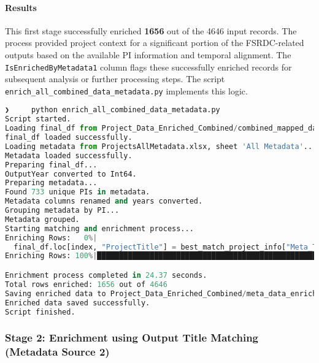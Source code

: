 \documentclass[12pt]{article}
\begin{document}
\paragraph{Results}\label{results-2}

This first stage successfully enriched \textbf{1656} out of the 4646
input records. The process provided project context for a significant
portion of the FSRDC-related outputs based on the available PI
information and temporal alignment. The \texttt{IsEnrichedByMetadata1}
column flags these successfully enriched records for subsequent analysis
or further processing steps. The script
\texttt{enrich\_all\_combined\_data\_metadata.py} implements this logic.

\begin{lstlisting}[language=Python]
❯     python enrich_all_combined_data_metadata.py
Script started.
Loading final_df from Project_Data_Enriched_Combined/combined_mapped_data_raw_enriched_final_final.csv...
final_df loaded successfully.
Loading metadata from ProjectsAllMetadata.xlsx, sheet 'All Metadata'...
Metadata loaded successfully.
Preparing final_df...
OutputYear converted to Int64.
Preparing metadata...
Found 733 unique PIs in metadata.
Metadata columns renamed and years converted.
Grouping metadata by PI...
Metadata grouped.
Starting matching and enrichment process...
Enriching Rows:   0%|                                                                                                                                                       | 0/4646 [00:00<?, ?it/s]/Users/justin/E/Upenn所有课程/cis590/project_3/enrich_all_combined_data_metadata.py:184: FutureWarning: Setting an item of incompatible dtype is deprecated and will raise an error in a future version of pandas. Value 'Household Mobility and Environmental Health' has dtype incompatible with float64, please explicitly cast to a compatible dtype first.
  final_df.loc[index, "ProjectTitle"] = best_match_project_info["Meta_Title"]
Enriching Rows: 100%|███████████████████████████████████████████████████████████████████████████████████████████████████████████████████████████████████████████| 4646/4646 [00:24<00:00, 190.77it/s]

Enrichment process completed in 24.37 seconds.
Total rows enriched: 1656 out of 4646
Saving enriched data to Project_Data_Enriched_Combined/meta_data_enriched_all.csv...
Enriched data saved successfully.
Script finished.
\end{lstlisting}

\subsubsection{Stage 2: Enrichment using Output Title Matching
(Metadata Source
2)}\label{stage-2-enrichment-using-output-title-matching-metadata-source-2}
\end{document}

